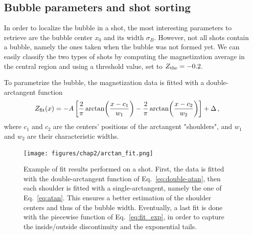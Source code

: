 \subsection{Bubble parameters and shot sorting}
In order to localize the bubble in a shot, the most interesting parameters to retrieve are the bubble center $x_0$ and its width $\sigma_B$. However, not all shots contain a bubble, namely the ones taken when the bubble was not formed yet. We can easily classify the two types of shots by computing the magnetization average in the central region and using a threshold value, set to $Z_{\rm thr} = -0.2$. 

To parametrize the bubble, the magnetization data is fitted with a double-arctangent function
\begin{equation}
    Z_{\rm fit}(x) = -A \left[\frac{2}{\pi}\arctan(\frac{x-c_1}{w_1}) - \frac{2}{\pi}\arctan(\frac{x-c_2}{w_2})\right] + \Delta\, ,
    \label{eq:double-atan}
\end{equation}
where $c_1$ and $c_2$ are the centers' positions of the arctangent "shoulders", and $w_1$ and $w_2$ are their characteristic widths. 
\begin{figure}[h!]
    \centering
    \texttt{[image: figures/chap2/arctan\_fit.png]}
    \caption{Example of fit results performed on a shot. First, the data is fitted with the double-arctangent function of Eq.\ \eqref{eq:double-atan}, then each shoulder is fitted with a single-arctangent, namely the one of Eq.\ \eqref{eq:atan}. This ensures a better estimation of the shoulder centers and thus of the bubble width. Eventually, a last fit is done with the piecewise function of Eq.\ \eqref{eq:fit_exp}, in order to capture the inside/outside discontinuity and the exponential tails.}
    \label{fig:atan-fit}
\end{figure}
